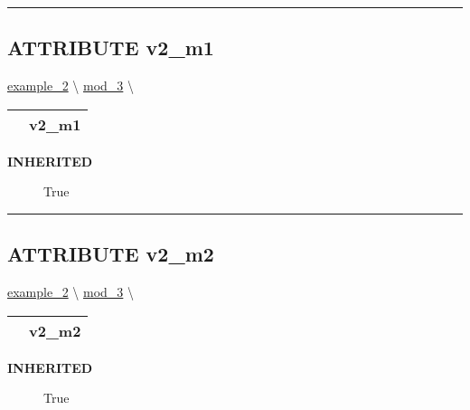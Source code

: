 \rule{\linewidth}{0.5pt}

\subsection*{\textsf{\colorbox{headtoc}{\color{white} ATTRIBUTE}
v2\_m1}}

\hypertarget{ecldoc:example_2.mod_1.v2_m1}{}
\hspace{0pt} \hyperlink{ecldoc:example_2}{example_2} \textbackslash 
\hspace{0pt} \hyperlink{ecldoc:example_2.mod_3}{mod_3} \textbackslash 

{\renewcommand{\arraystretch}{1.5}
\begin{tabularx}{\textwidth}{|>{\raggedright\arraybackslash}l|X|}
\hline
\hspace{0pt}\mytexttt{\color{red} } & \textbf{v2\_m1} \\
\hline
\end{tabularx}
}

\par

\par
\begin{description}
\item [\colorbox{tagtype}{\color{white} \textbf{\textsf{INHERITED}}}] \textbf{\underline{}} True
\end{description}

\rule{\linewidth}{0.5pt}
\subsection*{\textsf{\colorbox{headtoc}{\color{white} ATTRIBUTE}
v2\_m2}}

\hypertarget{ecldoc:example_2.mod_2.v2_m2}{}
\hspace{0pt} \hyperlink{ecldoc:example_2}{example_2} \textbackslash 
\hspace{0pt} \hyperlink{ecldoc:example_2.mod_3}{mod_3} \textbackslash 

{\renewcommand{\arraystretch}{1.5}
\begin{tabularx}{\textwidth}{|>{\raggedright\arraybackslash}l|X|}
\hline
\hspace{0pt}\mytexttt{\color{red} } & \textbf{v2\_m2} \\
\hline
\end{tabularx}
}

\par

\par
\begin{description}
\item [\colorbox{tagtype}{\color{white} \textbf{\textsf{INHERITED}}}] \textbf{\underline{}} True
\end{description}

